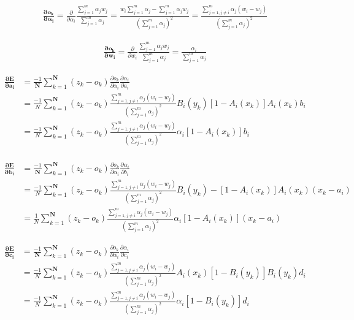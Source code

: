 \documentclass[paper=a4, fontsize=11pt]{scrartcl} %
\numberwithin{equation}{section} %
\numberwithin{figure}{section} %
\numberwithin{table}{section} %
\begin{document}
\begin{align*}
\mathbf{\frac{\partial o_k}{\partial \alpha_i}} = \frac{\partial}{\partial \alpha_i} \frac{\sum_{j=1}^{m} \alpha_j w_j}{\sum_{j=1}^{m} \alpha_j} = \frac{w_i \sum_{j = 1}^{m}\alpha_j - \sum_{j=1}^{m} \alpha_j w_j}{(\sum_{j=1}^{m}\alpha_j)^2} = \frac{\sum_{j = 1, j \neq i}^{m} \alpha_j (w_i - w_j)}{(\sum_{j=1}^{m} \alpha_j)^2 }
\end{align*}

\begin{align*}
\mathbf{\frac{\partial o_k}{\partial w_i}} = \frac{\partial}{\partial w_i} \frac{\sum_{j=1}^{m} \alpha_j w_j}{\sum_{j=1}^{m} \alpha_j} = \frac{\alpha_i}{\sum_{j=1}^{m} \alpha_j} 
\end{align*}

\begin{align*}
\mathbf{\frac{\partial E}{\partial a_i}} &= \frac{-1}{\mathbf{N}} \sum_{k=1}^{\mathbf{N}} (z_k - o_k) \frac{\partial o_k}{\partial\alpha_i} \frac{\partial \alpha_i}{\partial a_i}\\ &= \frac{-1}{N}\sum_{k=1}^{\mathbf{N}} (z_k - o_k) \frac{\sum_{j = 1, j \neq i}^{m} \alpha_j (w_i - w_j)}{(\sum_{j=1}^{m} \alpha_j)^2 } B_i(y_k) [1 - A_i(x_k)]A_i(x_k)b_i
\\ &= \frac{-1}{N}\sum_{k=1}^{\mathbf{N}} (z_k - o_k) \frac{\sum_{j = 1, j \neq i}^{m} \alpha_j (w_i - w_j)}{(\sum_{j=1}^{m} \alpha_j)^2 } \alpha_i [1 - A_i(x_k)]b_i \\
\end{align*}

\begin{align*}
\mathbf{\frac{\partial E}{\partial b_i}} &= \frac{-1}{\mathbf{N}} \sum_{k=1}^{\mathbf{N}} (z_k - o_k) \frac{\partial o_k}{\partial\alpha_i} \frac{\partial \alpha_i}{\partial b_i} 
\\ &= \frac{-1}{N}\sum_{k=1}^{\mathbf{N}} (z_k - o_k) \frac{\sum_{j = 1, j \neq i}^{m} \alpha_j (w_i - w_j)}{(\sum_{j=1}^{m} \alpha_j)^2 } B_i(y_k) -[1 -A_i(x_k)]A_i(x_k)(x_k - a_i)\\ &= 
\frac{1}{N}\sum_{k=1}^{\mathbf{N}} (z_k - o_k) \frac{\sum_{j = 1, j \neq i}^{m} \alpha_j (w_i - w_j)}{(\sum_{j=1}^{m} \alpha_j)^2 } \alpha_i [1 - A_i(x_k)](x_k - a_i)
\end{align*}

\begin{align*}
\mathbf{\frac{\partial E}{\partial c_i}} &= \frac{-1}{\mathbf{N}} \sum_{k=1}^{\mathbf{N}} (z_k - o_k) \frac{\partial o_k}{\partial\alpha_i} \frac{\partial \alpha_i}{\partial c_i}\\ &= \frac{-1}{N}\sum_{k=1}^{\mathbf{N}} (z_k - o_k) \frac{\sum_{j = 1, j \neq i}^{m} \alpha_j (w_i - w_j)}{(\sum_{j=1}^{m} \alpha_j)^2 } A_i(x_k) [1 - B_i(y_k)]B_i(y_k)d_i
\\ &= \frac{-1}{N}\sum_{k=1}^{\mathbf{N}} (z_k - o_k) \frac{\sum_{j = 1, j \neq i}^{m} \alpha_j (w_i - w_j)}{(\sum_{j=1}^{m} \alpha_j)^2 } \alpha_i [1 - B_i(y_k)]d_i \\
\end{align*}
\end{document}
